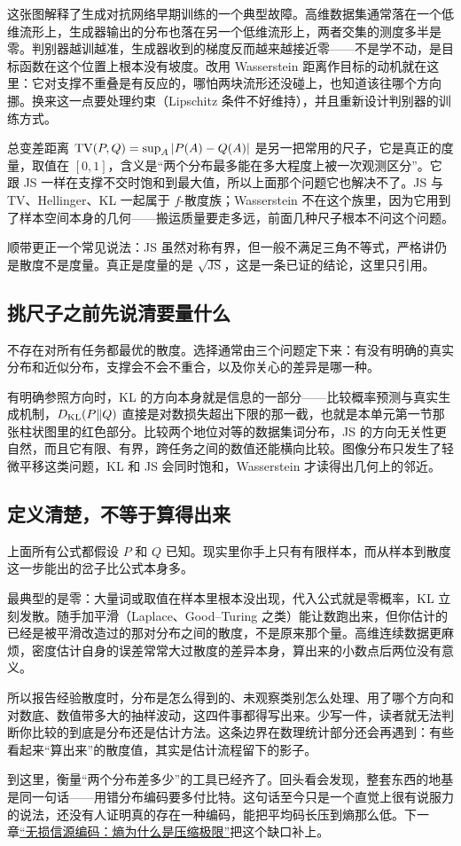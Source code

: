 这张图解释了生成对抗网络早期训练的一个典型故障。高维数据集通常落在一个低维流形上，生成器输出的分布也落在另一个低维流形上，两者交集的测度多半是零。判别器越训越准，生成器收到的梯度反而越来越接近零——不是学不动，是目标函数在这个位置上根本没有坡度。改用 Wasserstein 距离作目标的动机就在这里：它对支撑不重叠是有反应的，哪怕两块流形还没碰上，也知道该往哪个方向挪。换来这一点要处理约束（Lipschitz 条件不好维持），并且重新设计判别器的训练方式。

总变差距离 \(\operatorname{TV}(P,Q)=\sup_A\left|P(A)-Q(A)\right|\) 是另一把常用的尺子，它是真正的度量，取值在 \([0,1]\)，含义是``两个分布最多能在多大程度上被一次观测区分''。它跟 JS 一样在支撑不交时饱和到最大值，所以上面那个问题它也解决不了。JS 与 TV、Hellinger、KL 一起属于 \(f\)-散度族；Wasserstein 不在这个族里，因为它用到了样本空间本身的几何——搬运质量要走多远，前面几种尺子根本不问这个问题。

顺带更正一个常见说法：JS 虽然对称有界，但一般不满足三角不等式，严格讲仍是散度不是度量。真正是度量的是 \(\sqrt{\operatorname{JS}}\)，这是一条已证的结论，这里只引用。

\subsection{挑尺子之前先说清要量什么}

不存在对所有任务都最优的散度。选择通常由三个问题定下来：有没有明确的真实分布和近似分布，支撑会不会不重合，以及你关心的差异是哪一种。

有明确参照方向时，KL 的方向本身就是信息的一部分——比较概率预测与真实生成机制，\(D_{\mathrm{KL}}(P\|Q)\) 直接是对数损失超出下限的那一截，也就是本单元第一节那张柱状图里的红色部分。比较两个地位对等的数据集词分布，JS 的方向无关性更自然，而且它有限、有界，跨任务之间的数值还能横向比较。图像分布只发生了轻微平移这类问题，KL 和 JS 会同时饱和，Wasserstein 才读得出几何上的邻近。

\subsection{定义清楚，不等于算得出来}

上面所有公式都假设 \(P\) 和 \(Q\) 已知。现实里你手上只有有限样本，而从样本到散度这一步能出的岔子比公式本身多。

最典型的是零：大量词或取值在样本里根本没出现，代入公式就是零概率，KL 立刻发散。随手加平滑（Laplace、Good--Turing 之类）能让数跑出来，但你估计的已经是被平滑改造过的那对分布之间的散度，不是原来那个量。高维连续数据更麻烦，密度估计自身的误差常常大过散度的差异本身，算出来的小数点后两位没有意义。

所以报告经验散度时，分布是怎么得到的、未观察类别怎么处理、用了哪个方向和对数底、数值带多大的抽样波动，这四件事都得写出来。少写一件，读者就无法判断你比较的到底是分布还是估计方法。这条边界在数理统计部分还会再遇到：有些看起来``算出来''的散度值，其实是估计流程留下的影子。

到这里，衡量``两个分布差多少''的工具已经齐了。回头看会发现，整套东西的地基是同一句话——用错分布编码要多付比特。这句话至今只是一个直觉上很有说服力的说法，还没有人证明真的存在一种编码，能把平均码长压到熵那么低。下一章\hyperref[ch:057]{``无损信源编码：熵为什么是压缩极限''}把这个缺口补上。
